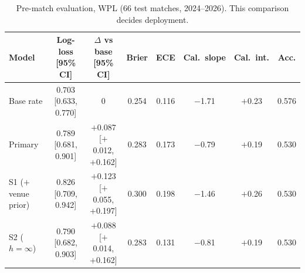 \begin{table}[t]\centering\footnotesize\setlength{\tabcolsep}{4pt}
\caption{Pre-match evaluation, WPL (66 test matches, 2024--2026). This comparison decides deployment.}\label{tab:wpl}
\begin{tabular}{lccccccc}\toprule
Model & Log-loss [95\% CI] & $\Delta$ vs base [95\% CI] & Brier & ECE & Cal.\ slope & Cal.\ int. & Acc.\\\midrule
Base rate & 0.703 [0.633, 0.770] & 0 & 0.254 & 0.116 & $-$1.71 & $+$0.23 & 0.576\\
Primary & 0.789 [0.681, 0.901] & $+$0.087 [$+$0.012, $+$0.162] & 0.283 & 0.173 & $-$0.79 & $+$0.19 & 0.530\\
S1 ($+$venue prior) & 0.826 [0.709, 0.942] & $+$0.123 [$+$0.055, $+$0.197] & 0.300 & 0.198 & $-$1.46 & $+$0.26 & 0.530\\
S2 ($h=\infty$) & 0.790 [0.682, 0.903] & $+$0.088 [$+$0.014, $+$0.162] & 0.283 & 0.131 & $-$0.81 & $+$0.19 & 0.530\\
\bottomrule\end{tabular}
\end{table}
